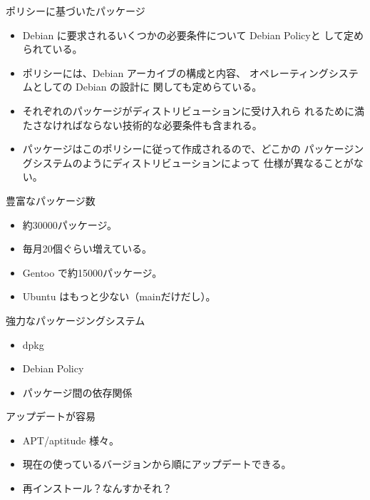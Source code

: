 \begin{frame}{ポリシーに基づいたパッケージ}
\begin{itemize}
\item Debian に要求されるいくつかの必要条件について Debian Policyと
して定められている。
\item ポリシーには、Debian アーカイブの構成と内容、
オペレーティングシステムとしての Debian の設計に
関しても定めらている。
\item それぞれのパッケージがディストリビューションに受け入れら
れるために満たさなければならない技術的な必要条件も含まれる。
\item パッケージはこのポリシーに従って作成されるので、どこかの
パッケージングシステムのようにディストリビューションによって
仕様が異なることがない。
\end{itemize}
\end{frame}


\begin{frame}{豊富なパッケージ数}
\begin{itemize}
\item 約30000パッケージ。
\item 毎月20個ぐらい増えている。
\item Gentoo で約15000パッケージ。
\item Ubuntu はもっと少ない（mainだけだし）。
\end{itemize}
\end{frame}


\begin{frame}{強力なパッケージングシステム}
\begin{itemize}
\item dpkg
\item Debian Policy
\item パッケージ間の依存関係
\end{itemize}

\end{frame}


\begin{frame}{アップデートが容易}
\begin{itemize}

\item APT/aptitude 様々。
\item 現在の使っているバージョンから順にアップデートできる。
\item 再インストール？なんすかそれ？
\end{itemize}

\end{frame}


